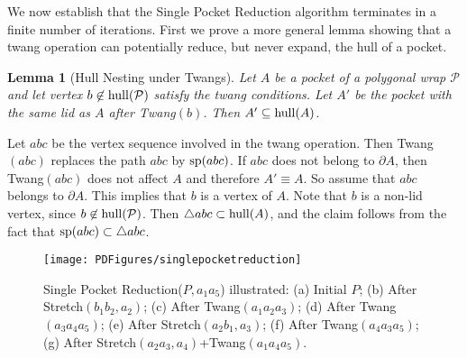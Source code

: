 \pdfoutput=1  \documentclass{article}
\def\hull{\mathop{\rm hull}\nolimits}
\def\sp{\mathop{\rm sp}\nolimits}
\def\st{{\sc Stretch}}
\def\tw{{\sc Twang}}
\newcommand\Pw{\mathcal{P}}
\newtheorem{lemma}[theorem]{Lemma}
\newcommand{\lemlab}[1]{\label{lemma:#1}}
\newcommand{\figlab}[1]{\label{fig:#1}}
\newcommand{\ABox}{
\raisebox{3pt}{\framebox[6pt]{\rule{6pt}{0pt}}}
}
\newenvironment{pf}{{\bf Proof:}}{\hfill\ABox}
\begin{document}
We now establish that the {\sc Single Pocket
Reduction} algorithm terminates in a finite number of iterations. First we 
prove a
more general lemma
showing that a twang operation can potentially reduce, but never
expand, the hull of a pocket.

\begin{lemma}[Hull Nesting under Twangs]
Let $A$ be a pocket of a polygonal wrap $\Pw$ and let vertex $b
\not\in \hull(\Pw)$ satisfy the twang conditions.
Let $A'$ be the pocket with the
same lid as $A$ after
\tw$(b)$. Then $A' \subseteq \hull(A)$.
\lemlab{twang.hull}
\end{lemma}


\begin{pf}
Let $abc$ be the vertex sequence involved in the twang operation.
Then \tw$(abc)$ replaces the path $abc$ by $\sp(abc)$.
If $abc$ does not belong to $\partial A$,
then \tw$(abc)$ does not affect $A$ and therefore $A' \equiv A$. So assume that
$abc$ belongs to $\partial A$. This implies that $b$ is a vertex of $A$.
Note that $b$ is a non-lid vertex, since
$b \not\in \hull(\Pw)$. Then $\triangle abc \subset \hull(A)$, and
the claim follows from the fact that $\sp(abc) \subset \triangle abc$.
\end{pf}

\vspace{-1.0em}
\begin{figure}[htbp]
\centering
\texttt{[image: PDFigures/singlepocketreduction]}
\vspace{-2em}\caption{\small{{\sc Single Pocket Reduction}($P,
a_1a_5$) 
illustrated: (a) Initial $P$; (b) After \st$(b_1b_2, a_2)$;
(c) After \tw$(a_1a_2a_3)$; (d) After \tw$(a_3a_4a_5)$; (e) After
\st$(a_2b_1, a_3)$; (f) After \tw$(a_4a_3a_5)$; (g) After
\st$(a_2a_3, a_4)$+\tw$(a_1a_4a_5)$.}}
\figlab{single.pocket.reduction}
\end{figure}
\end{document}

